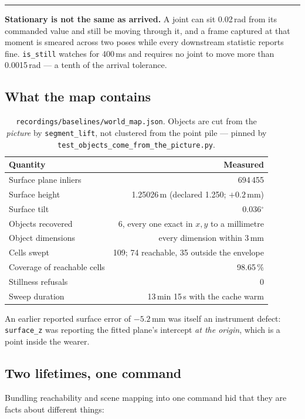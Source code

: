\documentclass[11pt,a4paper,oneside]{report}
\newcommand{\code}[1]{\texttt{\small #1}}
\newcommand{\file}[1]{\texttt{\small #1}}
\newcommand{\dg}{$^{\circ}$}
\newcommand{\keyfact}[1]{%
  \par\vspace{7pt}\noindent
  \hspace*{0pt}\textcolor{srlblue}{\rule{2.5pt}{\dimexpr\baselineskip\relax}}%
  \hspace{9pt}%
  \begin{minipage}[t]{\dimexpr\textwidth-14pt\relax}
  \small #1
  \end{minipage}\par\vspace{7pt}}
\begin{document}
\keyfact{\textbf{Stationary is not the same as arrived.} A joint can sit
0.02\,rad from its commanded value and still be moving through it, and a frame
captured at that moment is smeared across two poses while every downstream
statistic reports fine. \code{is\_still} watches for 400\,ms and requires no
joint to move more than 0.0015\,rad --- a tenth of the arrival tolerance.}

\subsection{What the map contains}

\begin{table}[H]
\centering
\small
\begin{tabular}{@{}lr@{}}
\toprule
\textbf{Quantity} & \textbf{Measured} \\
\midrule
Surface plane inliers & 694\,455 \\
Surface height & 1.25026\,m (declared 1.250; $+0.2$\,mm) \\
Surface tilt & 0.036\dg \\
Objects recovered & 6, every one exact in $x,y$ to a millimetre \\
Object dimensions & every dimension within 3\,mm \\
Cells swept & 109; 74 reachable, 35 outside the envelope \\
Coverage of reachable cells & 98.65\,\% \\
Stillness refusals & 0 \\
Sweep duration & 13\,min 15\,s with the cache warm \\
\bottomrule
\end{tabular}
\caption{\file{recordings/baselines/world\_map.json}. Objects are cut from the
\emph{picture} by \code{segment\_lift}, not clustered from the point pile ---
pinned by \file{test\_objects\_come\_from\_the\_picture.py}.}
\end{table}

An earlier reported surface error of $-5.2$\,mm was itself an instrument
defect: \code{surface\_z} was reporting the fitted plane's intercept
\emph{at the origin}, which is a point inside the wearer.

\subsection{Two lifetimes, one command}

Bundling reachability and scene mapping into one command hid that they are
facts about different things:
\end{document}
